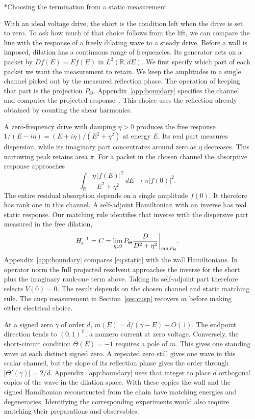 \documentclass[11pt,letterpaper]{article}
\makeatletter
\renewcommand\subsection{\@startsection{subsection}{2}{\z@}{-2.0ex plus -.3ex}{.75ex}{\normalfont\normalsize\itshape}}
\numberwithin{equation}{section}
\makeatother
\begin{document}
\subsection*{Choosing the termination from a static measurement}

With an ideal voltage drive, the short is the condition left when the drive is set to zero. To ask how much of that choice follows from the lift, we can compare the line with the response of a freely dilating wave to a steady drive. Before a wall is imposed, dilation has a continuous range of frequencies. Its generator acts on a packet by $Df(E)=Ef(E)$ in $L^2(\mathbb R,dE)$. We first specify which part of each packet we want the measurement to retain. We keep the amplitudes in a single channel picked out by the measured reflection phase. The operation of keeping that part is the projection $P_\Theta$. Appendix~\ref{app:boundary} specifies the channel and computes the projected response~\cite{suzukiglobal}. This choice uses the reflection already obtained by counting the shear harmonics.

A zero-frequency drive with damping $\eta>0$ produces the free response $1/(E-i\eta)=(E+i\eta)/(E^2+\eta^2)$ at energy $E$. Its real part measures dispersion, while its imaginary part concentrates around zero as $\eta$ decreases. This narrowing peak retains area $\pi$. For a packet in the chosen channel the absorptive response approaches
\[
 \int_{\mathbb R}\frac{\eta\,|f(E)|^2}{E^2+\eta^2}\,dE
     \longrightarrow \pi|f(0)|^2 .
\]
The entire residual absorption depends on a single amplitude $f(0)$. It therefore has rank one in this channel. A self-adjoint Hamiltonian with an inverse has real static response. Our matching rule identifies that inverse with the dispersive part measured in the free dilation,
\begin{equation}
 H_{\rm s}^{-1}=C=\lim_{\eta\downarrow0}
       P_\Theta\frac{D}{D^2+\eta^2}\bigg|_{\operatorname{ran}P_\Theta}.
 \label{eq:static}
\end{equation}
Appendix~\ref{app:boundary} compares \eqref{eq:static} with the wall Hamiltonians. In operator norm the full projected resolvent approaches the inverse for the short plus the imaginary rank-one term above. Taking its self-adjoint part therefore selects $V(0)=0$. The result depends on the chosen channel and static matching rule. The cusp measurement in Section~\ref{sec:cusp} recovers $m$ before making either electrical choice.

At a signed zero $\gamma$ of order $d$, $m(E)=d/(\gamma-E)+O(1)$. The endpoint direction tends to $(0,1)^{\mathrm T}$, a nonzero current at zero voltage. Conversely, the short-circuit condition $\Theta(E)=-1$ requires a pole of $m$. This gives one standing wave at each distinct signed zero. A repeated zero still gives one wave in this scalar channel, but the slope of its reflection phase gives the order through $|\Theta'(\gamma)|=2/d$. Appendix~\ref{app:boundary} uses that integer to place $d$ orthogonal copies of the wave in the dilation space. With these copies the wall and the signed Hamiltonian reconstructed from the chain have matching energies and degeneracies. Identifying the corresponding experiments would also require matching their preparations and observables.
\end{document}
